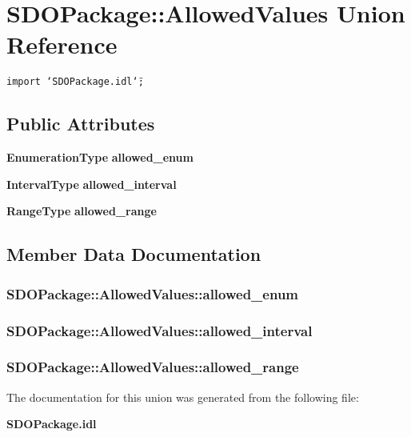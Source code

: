 \section{SDOPackage::Allowed\-Values Union Reference}
\label{unionSDOPackage_1_1AllowedValues}
{\tt import \char`\"{}SDOPackage.idl\char`\"{};}

\subsection*{Public Attributes}
\begin{CompactItemize}
\item 
{\bf Enumeration\-Type} {\bf allowed\_\-enum}
\item 
{\bf Interval\-Type} {\bf allowed\_\-interval}
\item 
{\bf Range\-Type} {\bf allowed\_\-range}
\end{CompactItemize}


\subsection{Member Data Documentation}
\subsubsection{ {\bf SDOPackage::Allowed\-Values::allowed\_\-enum}}\label{unionSDOPackage_1_1AllowedValues_SDOPackage_1_1AllowedValueso0}


\subsubsection{ {\bf SDOPackage::Allowed\-Values::allowed\_\-interval}}\label{unionSDOPackage_1_1AllowedValues_SDOPackage_1_1AllowedValueso1}


\subsubsection{ {\bf SDOPackage::Allowed\-Values::allowed\_\-range}}\label{unionSDOPackage_1_1AllowedValues_SDOPackage_1_1AllowedValueso2}




The documentation for this union was generated from the following file:\begin{CompactItemize}
\item 
{\bf SDOPackage.idl}\end{CompactItemize}
